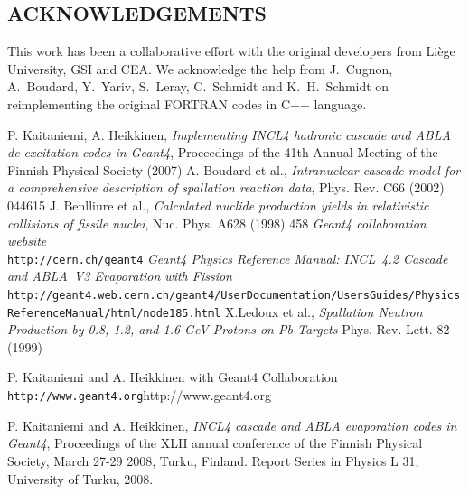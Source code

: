 \documentclass[20pt]{article}
\newenvironment{textbox}
{\begin{lrbox}{\dummybox}\begin{minipage}{0.9\columnwidth}}
{\end{minipage}\end{lrbox}\raisebox{-\depth}{\psshadowbox[framesep=1em,framearc=.1,shadow=true]{\usebox{\dummybox}}}\vspace{0.005\textheight}}
\begin{document}
\begin{center}
\begin{multicols}{3}
\begin{textbox}


\section*{{\Huge {\sf ACKNOWLEDGEMENTS}}}

This work has been a collaborative effort with the original developers from
Li\`ege University, GSI and CEA. We acknowledge the help from J.~Cugnon,
A.~Boudard, Y.~Yariv, S.~Leray, C.~Schmidt and K.~H.~Schmidt
on reimplementing the original {\sf FORTRAN} codes in {\sf C++} language.

\end{textbox}
\vskip2cm
\begin{textbox}

{\Large
{}
\begin{thebibliography}{9}
 P. Kaitaniemi, A. Heikkinen, \emph{Implementing INCL4
    hadronic cascade and ABLA de-excitation codes in Geant4},
  Proceedings of the 41th Annual Meeting of the Finnish Physical
  Society (2007)
 A. Boudard et al., \emph{Intranuclear cascade model for
    a comprehensive description of spallation reaction data}, Phys.
  Rev. C66 (2002) 044615
 J. Benlliure et al., \emph{Calculated nuclide
    production yields in relativistic collisions of fissile nuclei},
  Nuc. Phys. A628 (1998) 458
 \emph{Geant4 collaboration website} \\ {\tt http://\-cern.ch/\-geant4}
 \emph{Geant4 Physics Reference Manual: INCL~4.2 Cascade and ABLA~V3 Evaporation with Fission} \\ {\tt http://geant4.web.cern.ch/\-geant4/\-UserDocumentation/\-UsersGuides/\-PhysicsReferenceManual/\-html/\-node185.html}
 X.Ledoux et al., \emph{Spallation Neutron Production by
  0.8, 1.2, and 1.6 GeV Protons on Pb Targets} Phys. Rev. Lett. 82
  (1999)

P. Kaitaniemi and A. Heikkinen with Geant4 Collaboration
{\tt http://www.geant4.org}{http://www.geant4.org}

P. Kaitaniemi and A. Heikkinen,  
{\em INCL4 cascade and ABLA evaporation codes in Geant4},
Proceedings of the XLII annual conference of the Finnish Physical Society, 
                 March 27-29 2008, Turku, Finland. 
                 Report Series in Physics L 31, University of Turku, 2008.


\end{thebibliography}}
\end{textbox}
\end{multicols}
\end{center}
\end{document}
